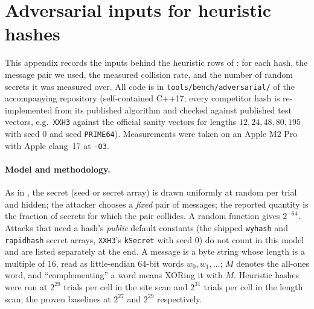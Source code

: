 \section{Adversarial inputs for heuristic hashes}
\label{app:adversarial}

This appendix records the inputs behind the heuristic rows of
: for each hash, the message pair we used, the
measured collision rate, and the number of random secrets it was measured over.
All code is in \texttt{tools/bench/adversarial/} of the accompanying repository
(self-contained C++17; every competitor hash is re-implemented from its
published algorithm and checked against published test vectors, e.g.\
\texttt{XXH3} against the official sanity vectors for lengths
$12, 24, 48, 80, 195$ with seed $0$ and seed \texttt{PRIME64}).  Measurements
were taken on an Apple M2 Pro with Apple clang~17 at \texttt{-O3}.

\paragraph{Model and methodology.}
As in , the secret (seed or secret array) is
drawn uniformly at random per trial and hidden; the attacker chooses a
\emph{fixed} pair of messages; the reported quantity is the fraction of secrets
for which the pair collides.  A random function gives $2^{-64}$.  Attacks that
need a hash's \emph{public} default constants (the shipped \texttt{wyhash} and
\texttt{rapidhash} secret arrays, \texttt{XXH3}'s \texttt{kSecret} with seed
$0$) do not count in this model and are listed separately at the end.  A
message is a byte string whose length is a multiple of $16$, read as
little-endian 64-bit words $w_0,w_1,\ldots$; $M$ denotes the all-ones word, and
``complementing'' a word means XORing it with $M$.  Heuristic hashes were run
at $2^{29}$ trials per cell in the site scan and $2^{31}$ trials per cell in the
length scan; the proven baselines at $2^{27}$ and $2^{29}$ respectively.

